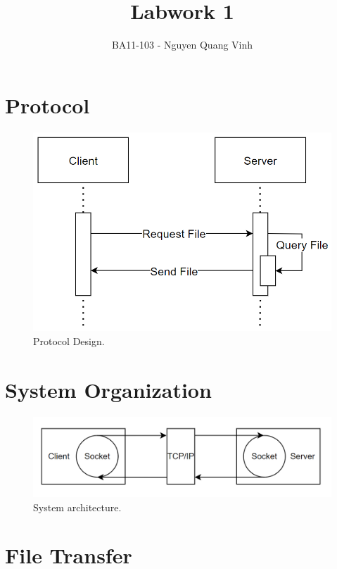 \documentclass{article}
\title{Labwork 1}
\author{BA11-103 - Nguyen Quang Vinh}
\begin{document}
\maketitle

\section{Protocol}

\begin{figure}[h]
\centering
\includegraphics[width=0.8\linewidth]{Protocol.png}
\caption{\label{fig:Protocol}Protocol Design.}
\end{figure}

\section{System Organization}

\begin{figure}[h]
\centering
\includegraphics[width=0.8\linewidth]{System.png}
\caption{\label{fig:System}System architecture.}
\end{figure}

\section{File Transfer}
\end{document}
